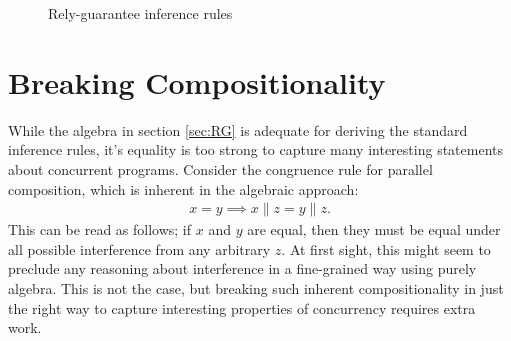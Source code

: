 \documentclass{llncs}
\begin{document}
\begin{figure}[tbh]
\centering
\begin{prooftree}
\end{prooftree}

\begin{prooftree}
\end{prooftree}

\begin{prooftree}
\end{prooftree}

\begin{prooftree}
\end{prooftree}

\begin{prooftree}
\end{prooftree}

\begin{prooftree}
\end{prooftree}
\caption{Rely-guarantee inference rules}
\label{fig:rgrules}
\end{figure}


\section{Breaking Compositionality}
\label{sec:INT}

While the algebra in section \ref{sec:RG} is adequate for deriving the
standard inference rules, it's equality is too strong to capture many
interesting statements about concurrent programs. Consider the
congruence rule for parallel composition, which is inherent in the
algebraic approach:
\begin{align*}
x = y \implies x\|z = y\|z.
\end{align*}
This can be read as follows; if $x$ and $y$ are equal, then they must
be equal under all possible interference from any arbitrary $z$. At
first sight, this might seem to preclude any reasoning about
interference in a fine-grained way using purely algebra. This is not
the case, but breaking such inherent compositionality in just the
right way to capture interesting properties of concurrency requires
extra work.
\end{document}
